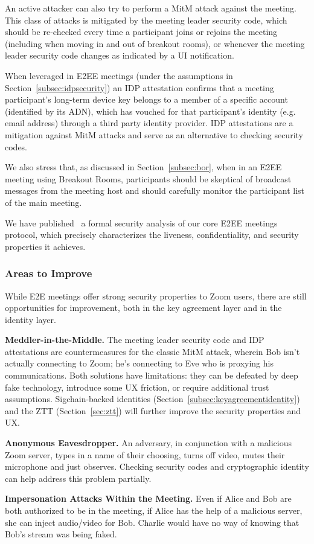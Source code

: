 An active attacker can also try to perform a MitM attack against the meeting. This class of attacks
is mitigated by the meeting leader security code, which should be re-checked every time a
participant joins or rejoins the meeting (including when moving in and out of breakout rooms), or
whenever the meeting leader security code changes as indicated by a UI notification.

When leveraged in E2EE meetings (under the assumptions in Section~\ref{subsec:idpsecurity}) an IDP
attestation confirms that a meeting participant's long-term device key belongs to a member of a specific account (identified by its ADN), which has vouched for that participant's identity (e.g. email address) through a third party identity provider. IDP attestations are a mitigation against MitM attacks and serve as an alternative to checking security codes.

We also stress that, as discussed in Section~\ref{subsec:bor}, when in an E2EE meeting using Breakout
Rooms, participants should be skeptical of broadcast messages from the meeting host and should
carefully monitor the participant list of the main meeting.

We have published~\cite{eurocrypt-2023-32928} a formal security analysis of our core E2EE meetings protocol,
which precisely characterizes the liveness, confidentiality, and security properties it achieves.

\subsubsection{Areas to Improve}
While E2E meetings offer strong security properties to Zoom users, there are still opportunities for
improvement, both in the key agreement layer and in the identity layer.
\begin{description}
\item {\bf Meddler-in-the-Middle.} The meeting leader security code and IDP attestations are
countermeasures for the classic MitM attack, wherein Bob isn't actually connecting to Zoom; he's
connecting to Eve who is proxying his communications. Both solutions have limitations: they can be
defeated by deep fake technology, introduce some UX friction, or require additional trust assumptions.
Sigchain-backed identities (Section~\ref{subsec:keyagreementidentity}) and the ZTT
(Section~\ref{sec:ztt}) will further improve the security properties and UX.
\item {\bf Anonymous Eavesdropper.} An adversary, in conjunction with a malicious Zoom server, types
in a name of their choosing, turns off video, mutes their microphone and just observes. Checking
security codes and cryptographic identity can help address this problem partially.
\item {\bf Impersonation Attacks Within the Meeting.} Even if Alice and Bob are both authorized to
be in the meeting, if Alice has the help of a malicious server, she can inject audio/video for Bob.
Charlie would have no way of knowing that Bob's stream was being faked.
\end{description}
